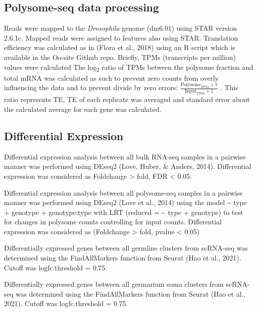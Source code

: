 \documentclass[12pt,oneside]{reedthesis}
\begin{document}
\hypertarget{polysome-seq-data-processing}{%
\subsection{Polysome-seq data processing}\label{polysome-seq-data-processing}}

Reads were mapped to the \emph{Drosophila} genome (dm6.01) using STAR version
2.6.1c. Mapped reads were assigned to features also using STAR.
Translation efficiency was calculated as in (Flora et al., 2018) using
an R script which is available in the Oo-site Github repo. Briefly, TPMs
(transcripts per million) values were calculated The log\textsubscript{2} ratio of
TPMs between the polysome fraction and total mRNA was calculated as such
to prevent zero counts from overly influencing the data and to prevent
divide by zero errors:
\(\frac{\text{Polysome}_{\text{TPM}} + 1}{\text{Input}_{\text{TPM}} + 1}\)
. This ratio represents TE, TE of each replicate was averaged and
standard error about the calculated average for each gene was
calculated.

\hypertarget{differential-expression}{%
\subsection{Differential Expression}\label{differential-expression}}

Differential expression analysis between all bulk RNA-seq samples in a
pairwise manner was performed using DEseq2
(Love, Huber, \& Anders, 2014). Differential expression was
considered as Foldchange \textgreater{} \textbar{} fold, FDR \textless{} 0.05.

Differential expression analysis between all polysome-seq samples in a
pairwise manner was performed using DEseq2
(Love et al., 2014) using the model \textasciitilde{} type + genotype
+ genotype:type with LRT (reduced = \textasciitilde{} type + genotype) to test for
changes in polysome counts controlling for input counts. Differential
expression was considered as (Foldchange \textgreater{} \textbar{} fold, pvalue \textless{} 0.05)

Differentially expressed genes between all germline clusters from
scRNA-seq was determined using the FindAllMarkers function from Seurat
(Hao et al., 2021). Cutoff was logfc.threshold =
0.75.

Differentially expressed genes between all germarium soma clusters from
scRNA-seq was determined using the FindAllMarkers function from Seurat
(Hao et al., 2021). Cutoff was logfc.threshold =
0.75.
\end{document}
